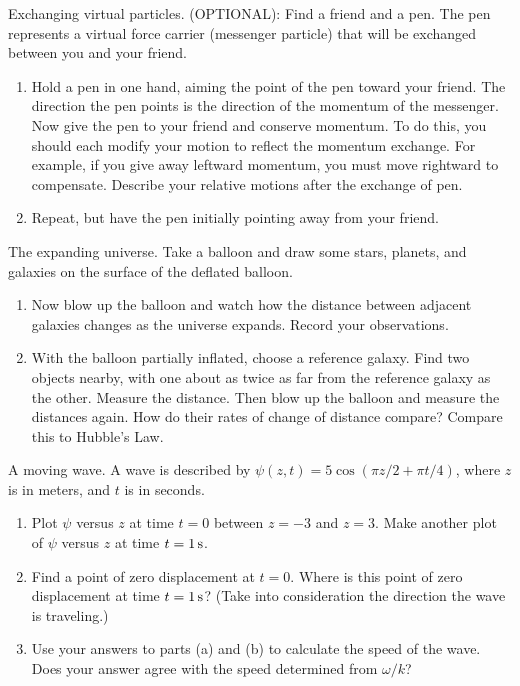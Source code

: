 \begin{aproblem}{Exchanging virtual particles.} 
  (OPTIONAL): Find a friend and a pen.  The pen represents a virtual
  force carrier (messenger particle) that will be exchanged between
  you and your friend.

  \begin{enumerate}
  \item Hold a pen in one hand, aiming the point of the pen toward
    your friend.  The direction the pen points is the direction of the
    momentum of the messenger.  Now give the pen to your friend and
    conserve momentum.  To do this, you should each modify your motion
    to reflect the momentum exchange.  For example, if you give away
    leftward momentum, you must move rightward to compensate. Describe
    your relative motions after the exchange of pen.

  \item Repeat, but have the pen initially pointing away from your
    friend.

  \end{enumerate}
\end{aproblem}


\begin{aproblem}{The expanding universe.}  
  Take a balloon and draw some stars, planets, and galaxies on the
  surface of the deflated balloon.
  \begin{enumerate}
  \item Now blow up the balloon and watch how the distance between
    adjacent galaxies changes as the universe expands.  Record your
    observations.
  \item With the balloon partially inflated, choose a reference
    galaxy.  Find two objects nearby, with one about as twice as far
    from the reference galaxy as the other.  Measure the distance.
    Then blow up the balloon and measure the distances again.  How do
    their rates of change of distance compare?  Compare this to
    Hubble's Law.
  \end{enumerate}
\end{aproblem}


\begin{aproblem}{A moving wave.}
  A wave is described by $\psi(z,t) = 5 \cos\left(\pi z/2 + \pi
  t/4\right)$, where $z$ is in meters, and $t$ is in seconds.
  \begin{enumerate}
  \item Plot $\psi$ versus $z$ at time $t=0$ between $z = -3$ and $z =
    3$.  Make another plot of $\psi$ versus $z$ at time
    $t=1\,\mbox{s}$.
  \item Find a point of zero displacement at $t=0$.  Where is this
    point of zero displacement at time $t=1\,\mbox{s}$?  (Take into
    consideration the direction the wave is traveling.)
  \item Use your answers to parts (a) and (b) to calculate the speed
    of the wave.  Does your answer agree with the speed determined
    from $\omega/k$?
  \end{enumerate}
\end{aproblem}

